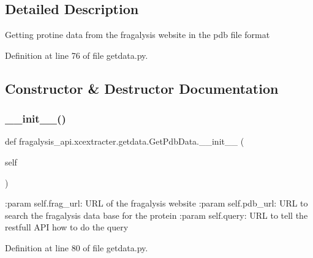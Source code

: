 \subsection{Detailed Description}
\begin{DoxyVerb}Getting protine data from the fragalysis website in the pdb file format
\end{DoxyVerb}
 

Definition at line 76 of file getdata.\+py.



\subsection{Constructor \& Destructor Documentation}
\mbox{\label{classfragalysis__api_1_1xcextracter_1_1getdata_1_1_get_pdb_data_abe03d6df71459bf479db778df7122186}} 
\subsubsection{\texorpdfstring{\+\_\+\+\_\+init\+\_\+\+\_\+()}{\_\_init\_\_()}}
{\footnotesize\ttfamily def fragalysis\+\_\+api.\+xcextracter.\+getdata.\+Get\+Pdb\+Data.\+\_\+\+\_\+init\+\_\+\+\_\+ (\begin{DoxyParamCaption}\item[{}]{self }\end{DoxyParamCaption})}

\begin{DoxyVerb}:param self.frag_url: URL of the fragalysis website
:param self.pdb_url: URL to search the fragalysis data base for the protein
:param self.query: URL to tell the restfull API how to do the query
\end{DoxyVerb}
 

Definition at line 80 of file getdata.\+py.


